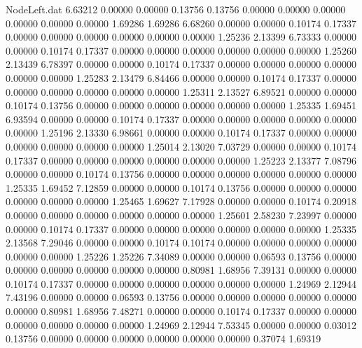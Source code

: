 \begin{filecontents}{NodeLeft.dat}
   6.63212    0.00000    0.00000     0.13756    0.13756    0.00000    0.00000    0.00000    0.00000    0.00000    0.00000    1.69286    1.69286
   6.68260    0.00000    0.00000     0.10174    0.17337    0.00000    0.00000    0.00000    0.00000    0.00000    0.00000    1.25236    2.13399
   6.73333    0.00000    0.00000     0.10174    0.17337    0.00000    0.00000    0.00000    0.00000    0.00000    0.00000    1.25260    2.13439
   6.78397    0.00000    0.00000     0.10174    0.17337    0.00000    0.00000    0.00000    0.00000    0.00000    0.00000    1.25283    2.13479
   6.84466    0.00000    0.00000     0.10174    0.17337    0.00000    0.00000    0.00000    0.00000    0.00000    0.00000    1.25311    2.13527
   6.89521    0.00000    0.00000     0.10174    0.13756    0.00000    0.00000    0.00000    0.00000    0.00000    0.00000    1.25335    1.69451
   6.93594    0.00000    0.00000     0.10174    0.17337    0.00000    0.00000    0.00000    0.00000    0.00000    0.00000    1.25196    2.13330
   6.98661    0.00000    0.00000     0.10174    0.17337    0.00000    0.00000    0.00000    0.00000    0.00000    0.00000    1.25014    2.13020
   7.03729    0.00000    0.00000     0.10174    0.17337    0.00000    0.00000    0.00000    0.00000    0.00000    0.00000    1.25223    2.13377
   7.08796    0.00000    0.00000     0.10174    0.13756    0.00000    0.00000    0.00000    0.00000    0.00000    0.00000    1.25335    1.69452
   7.12859    0.00000    0.00000     0.10174    0.13756    0.00000    0.00000    0.00000    0.00000    0.00000    0.00000    1.25465    1.69627
   7.17928    0.00000    0.00000     0.10174    0.20918    0.00000    0.00000    0.00000    0.00000    0.00000    0.00000    1.25601    2.58230
   7.23997    0.00000    0.00000     0.10174    0.17337    0.00000    0.00000    0.00000    0.00000    0.00000    0.00000    1.25335    2.13568
   7.29046    0.00000    0.00000     0.10174    0.10174    0.00000    0.00000    0.00000    0.00000    0.00000    0.00000    1.25226    1.25226
   7.34089    0.00000    0.00000     0.06593    0.13756    0.00000    0.00000    0.00000    0.00000    0.00000    0.00000    0.80981    1.68956
   7.39131    0.00000    0.00000     0.10174    0.17337    0.00000    0.00000    0.00000    0.00000    0.00000    0.00000    1.24969    2.12944
   7.43196    0.00000    0.00000     0.06593    0.13756    0.00000    0.00000    0.00000    0.00000    0.00000    0.00000    0.80981    1.68956
   7.48271    0.00000    0.00000     0.10174    0.17337    0.00000    0.00000    0.00000    0.00000    0.00000    0.00000    1.24969    2.12944
   7.53345    0.00000    0.00000     0.03012    0.13756    0.00000    0.00000    0.00000    0.00000    0.00000    0.00000    0.37074    1.69319

\end{filecontents}
